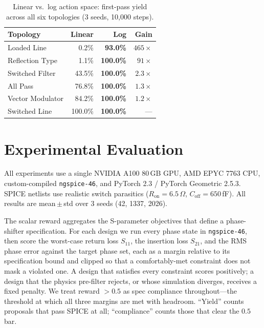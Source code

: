 \documentclass[sigconf,anonymous,review]{acmart}
\begin{document}
\begin{table}[t]
  \caption{Linear vs.\ log action space: first-pass yield across all
           six topologies (3 seeds, 10,000 steps).}
  \label{tab:warp}
  \centering\small
  \begin{tabular}{lrrr}
    \toprule
    Topology & Linear & Log & Gain \\
    \midrule
    Loaded Line       & 0.2\%   & \textbf{93.0\%}  & $465{\times}$ \\
    Reflection Type   & 1.1\%   & \textbf{100.0\%} & $91{\times}$  \\
    Switched Filter   & 43.5\%  & \textbf{100.0\%} & $2.3{\times}$ \\
    All Pass          & 76.8\%  & \textbf{100.0\%} & $1.3{\times}$ \\
    Vector Modulator  & 84.2\%  & \textbf{100.0\%} & $1.2{\times}$ \\
    Switched Line     & 100.0\% & \textbf{100.0\%} & ---           \\
    \bottomrule
  \end{tabular}
\end{table}

\section{Experimental Evaluation}
\label{sec:experiments}

All experiments use a single NVIDIA A100 80\,GB GPU, AMD EPYC 7763 CPU,
custom-compiled \texttt{ngspice-46}, and PyTorch 2.3 / PyTorch Geometric 2.5.3.
SPICE netlists use realistic switch parasitics ($R_\text{on}=6.5\,\Omega$,
$C_\text{off}=650$\,fF).  All results are mean\,$\pm$\,std over 3 seeds
(42, 1337, 2026).

The scalar reward aggregates the S-parameter objectives that define a
phase-shifter specification.  For each design we run every phase state in
\texttt{ngspice-46}, then score the worst-case return loss $S_{11}$, the
insertion loss $S_{21}$, and the RMS phase error against the target phase set,
each as a margin relative to its specification bound and clipped so that a
comfortably-met constraint does not mask a violated one.  A design that
satisfies every constraint scores positively; a design that the physics
pre-filter rejects, or whose simulation diverges, receives a fixed penalty.
We treat reward $>0.5$ as spec compliance throughout---the threshold at which
all three margins are met with headroom.  ``Yield'' counts proposals that pass
SPICE at all; ``compliance'' counts those that clear the $0.5$ bar.
\end{document}
